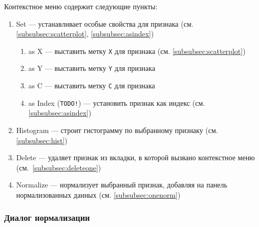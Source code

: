 \documentclass[12pt,tikz]{instruction}
\begin{document}
Контекстное меню содержит следующие пункты:
\begin{enumerate}
	\item Set --- устанавливает особые свойства для признака (см. \ref{subsubsec:scatterplot}, \ref{subsubsec:asindex})
	\begin{enumerate}
		\item as X --- выставить метку \texttt{X} для признака (см. \ref{subsubsec:scatterplot})
		\item as Y --- выставить метку \texttt{Y} для признака
		\item as C --- выставить метку \texttt{C} для признака
		\item as Index (\texttt{TODO!}) --- установить признак как индекс (см. \ref{subsubsec:asindex})
	\end{enumerate}
	\item Histogram --- строит гистограмму по выбранному признаку (см. \ref{subsubsec:hist})
	\item Delete --- удаляет признак из вкладки, в которой вызвано контекстное меню (\mbox{см. \ref{subsubsec:deleteone}})
	\item Normalize --- нормализует выбранный признак, добавляя на панель нормализованных данных (см. \ref{subsubsec:onenorm})

	
\end{enumerate}

\newpage
\subsubsection{Диалог нормализации}
\end{document}
